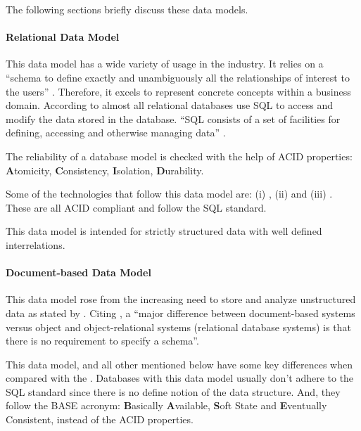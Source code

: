 The following sections briefly discuss these data models.

\paragraph{Relational Data Model}
\label{par:stateofart:arch:infra:store:relational}

This data model has a wide variety of usage in the industry. It relies on a ``schema to define exactly and unambiguously all the relationships of interest to the users'' \parencite{zaniolo1981design}. Therefore, it excels to represent concrete concepts within a business domain. According to \cite{jatana2012survey} almost all relational databases use \gls{SQL} to access and modify the data stored in the database. ``\gls{SQL} consists of a set of facilities for defining, accessing and otherwise managing data'' \parencite{date1989guide}. 

The reliability of a database model is checked with the help of ACID properties: \textbf{A}tomicity, \textbf{C}onsistency, \textbf{I}solation, \textbf{D}urability.

Some of the technologies that follow this data model are: (i) , (ii)  and (iii) .
These are all ACID compliant and follow the SQL standard.

This data model is intended for strictly structured data with well defined interrelations.

\paragraph{Document-based Data Model}
\label{par:stateofart:arch:infra:store:nosql}

This data model rose from the increasing need to store and analyze unstructured data as stated by \cite{miloslavskaya2016big}.  Citing \cite{elmasri2000fundamentals}, a ``major difference between document-based systems versus object and object-relational systems (relational database systems) is that there is no requirement to specify a schema''.

This data model, and all other mentioned below have some key differences when compared with the .
Databases with this data model usually don't adhere to the \gls{SQL} standard since there is no define notion of the data structure. And, they follow the BASE acronym: \textbf{B}asically \textbf{A}vailable, \textbf{S}oft State and \textbf{E}ventually Consistent, instead of the ACID properties.


